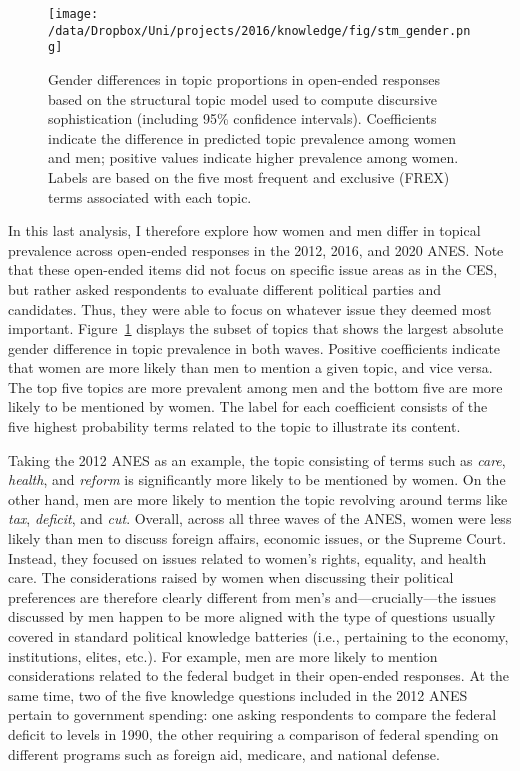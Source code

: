 \begin{figure}[ht]\centering
\texttt{[image: /data/Dropbox/Uni/projects/2016/knowledge/fig/stm\_gender.png]}
\caption[Gender differences in topic proprtions in open-ended responses]{Gender differences in topic proportions in open-ended responses based on the structural topic model used to compute discursive sophistication (including 95\% confidence intervals). Coefficients indicate the difference in predicted topic prevalence among women and men; positive values indicate higher prevalence among women. Labels are based on the five most frequent and exclusive (FREX) terms associated with each topic.
}\label{fig:stm_gender}
\end{figure}

In this last analysis, I therefore explore how women and men differ in topical prevalence across open-ended responses in the 2012, 2016, and 2020 ANES. Note that these open-ended items did not focus on specific issue areas as in the CES, but rather asked respondents to evaluate different political parties and candidates. Thus, they were able to focus on whatever issue they deemed most important. Figure~\ref{fig:stm_gender} displays the subset of topics that shows the largest absolute gender difference in topic prevalence in both waves. Positive coefficients indicate that women are more likely than men to mention a given topic, and vice versa. The top five topics are more prevalent among men and the bottom five are more likely to be mentioned by women. The label for each coefficient consists of the five highest probability terms related to the topic to illustrate its content.

Taking the 2012 ANES as an example, the topic consisting of terms such as \textit{care}, \textit{health}, and \textit{reform} is significantly more likely to be mentioned by women. On the other hand, men are more likely to mention the topic revolving around terms like \textit{tax}, \textit{deficit}, and \textit{cut}. Overall, across all three waves of the ANES, women were less likely than men to discuss foreign affairs, economic issues, or the Supreme Court. Instead, they focused on issues related to women's rights, equality, and health care. The considerations raised by women when discussing their political preferences are therefore clearly different from men's and---crucially---the issues discussed by men happen to be more aligned with the type of questions usually covered in standard political knowledge batteries (i.e., pertaining to the economy, institutions, elites, etc.). For example, men are more likely to mention considerations related to the federal budget in their open-ended responses. At the same time, two of the five knowledge questions included in the 2012 ANES pertain to government spending: one asking respondents to compare the federal deficit to levels in 1990, the other requiring a comparison of federal spending on different programs such as foreign aid, medicare, and national defense.

